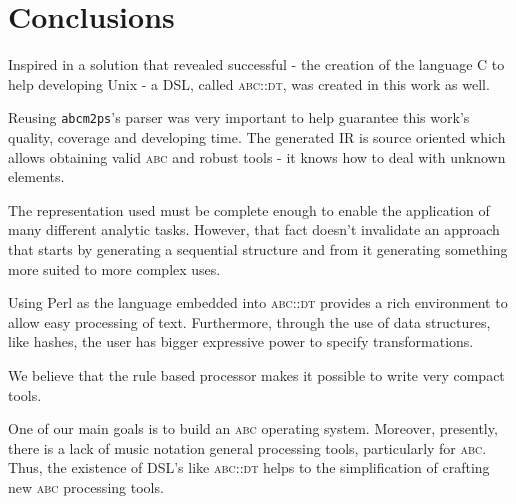 \documentclass[a4paper,UKenglish]{oasics}
\newcommand{\abc}{\textsc{abc}}
\newcommand{\abcdt}{\textsc{abc::dt}}
\newcommand{\abcmtops}{\texttt{abcm2ps}}
\begin{document}
\section{Conclusions}

Inspired in a solution that revealed successful - the creation of the language C to help developing
Unix - a DSL, called \abcdt{}, was created in this work as well.

Reusing \abcmtops{}'s parser was very important to help guarantee this work's quality, coverage and
developing time. The generated IR is source oriented which allows obtaining valid \abc{} and robust
tools - it knows how to deal with unknown elements.

The representation used must be complete enough to enable the application of many different analytic
tasks. However, that fact doesn't invalidate an approach that starts by generating a sequential
structure and from it generating something more suited to more complex uses.

Using Perl as the language embedded into \abcdt{} provides a rich environment to allow easy
processing of text. Furthermore, through the use of data structures, like hashes, the user has
bigger expressive power to specify transformations.

We believe that the rule based processor makes it possible to write very compact tools.

One of our main goals is to build an \abc{} operating system. Moreover, presently, there is a lack
of music notation general processing tools, particularly for \abc{}. Thus, the existence of DSL's
like \abcdt{} helps to the simplification of crafting new \abc{} processing tools.


\end{document}
